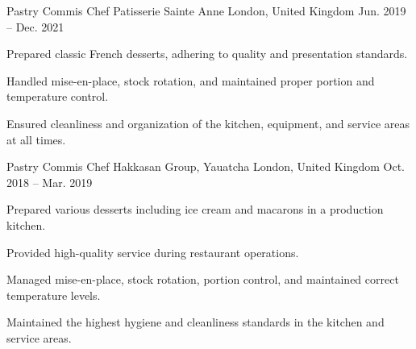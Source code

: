 

\begin{cventries}

  \cventry
    {Pastry Commis Chef} %
    {Patisserie Sainte Anne} %
    {London, United Kingdom} %
    {Jun. 2019 -- Dec. 2021} %
    {
      \begin{cvitems} %
        \item {Prepared classic French desserts, adhering to quality and presentation standards.}
        \item {Handled mise-en-place, stock rotation, and maintained proper portion and temperature control.}
        \item {Ensured cleanliness and organization of the kitchen, equipment, and service areas at all times.}
      \end{cvitems}
    }

  \cventry
    {Pastry Commis Chef} %
    {Hakkasan Group, Yauatcha} %
    {London, United Kingdom} %
    {Oct. 2018 -- Mar. 2019} %
    {
      \begin{cvitems} %
        \item {Prepared various desserts including ice cream and macarons in a production kitchen.}
        \item {Provided high-quality service during restaurant operations.}
        \item {Managed mise-en-place, stock rotation, portion control, and maintained correct temperature levels.}
        \item {Maintained the highest hygiene and cleanliness standards in the kitchen and service areas.}
      \end{cvitems}
    }


\end{cventries}
